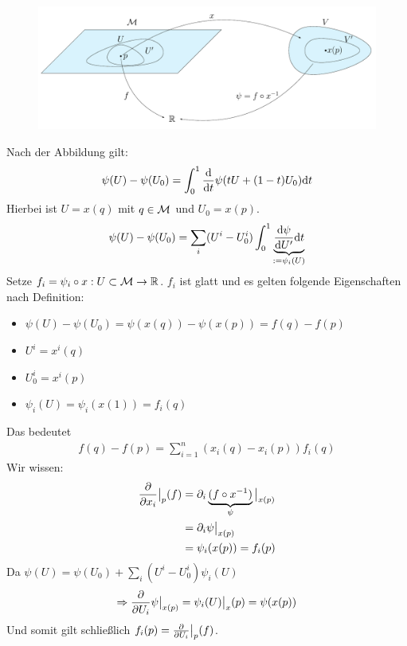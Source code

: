 \begin{bew} \leavevmode

\begin{figure}[H]
\centering
\includegraphics[width=1\linewidth]{figures/tikz/lemma_tangntialvectors.pdf}
\label{img:lemmaDarstellungBasisTPM}
\end{figure}

Nach der Abbildung gilt:
\begin{align}
\psi(U) - \psi(U_0) = \int^1_0 \dv{t} \psi(t U + (1- t) U_0) \dd t
\end{align}
Hierbei ist $U=x(q)$ mit $q \in \mathcal{M}$ und $U_0 = x(p)$.
\begin{align}
\psi(U) - \psi(U_0) = \sum_i (U^i- U^i_0) \int^1_0 \underbrace{\dv{\psi}{U'} (t U + (1 - t) U_0) \dd t}_{:= \psi_i (U)}
\end{align}
Setze $f_i = \psi_i \circ x : U \subset \mathcal{M} \to \mathbb{R}$.
$f_i$ ist glatt und es gelten folgende Eigenschaften nach Definition:
\begin{itemize}
\item $\psi(U)- \psi(U_0) = \psi(x(q)) - \psi(x(p)) = f(q)- f(p)$
\item $U^i = x^i (q)$
\item $U_0^i = x^i(p)$
\item $\psi_i (U) = \psi_i (x(1)) = f_i(q)$
\end{itemize}
Das bedeutet
\begin{align}
f(q)- f(p) = \sum_{i=1}^n (x_i (q) - x_i (p)) f_i(q)
\end{align}
Wir wissen:
\begin{align}
\pdv{x_i}\big\vert_{p} (f) &= \partial_i \underbrace{(f \circ x^{-1})}_{\psi} \big \vert_{x(p)} \\
&= \partial_i \psi \big\vert_{x(p)}\\
&= \psi_i (x(p)) = f_i (p)
\end{align}
Da $\psi(U) = \psi(U_0) + \sum_i (U^i - U^i_0)\psi_i(U)$
\begin{align}
\Rightarrow \pdv{U_i} \psi \big\vert_{x(p)} = \psi_i(U) \big\vert_x(p) = \psi(x(p))
\end{align}
Und somit gilt schließlich $f_i (p) = \pdv{U_i} \big\vert_p (f)$.
\end{bew}

